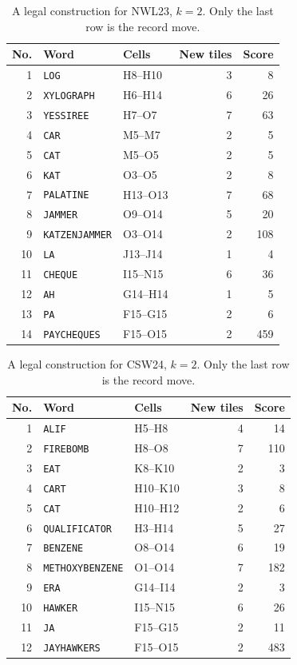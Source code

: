 \clearpage
\begin{table}[!ht]\centering\small
\caption{A legal construction for NWL23, $k=2$. Only the last row is the record move.}
\label{tab:NWL23-2-history}
\begin{tabular}{@{}rllrr@{}}\toprule
No. & Word & Cells & New tiles & Score\\\midrule
1 & \texttt{LOG} & H8--H10 & 3 & 8\\
2 & \texttt{XYLOGRAPH} & H6--H14 & 6 & 26\\
3 & \texttt{YESSIREE} & H7--O7 & 7 & 63\\
4 & \texttt{CAR} & M5--M7 & 2 & 5\\
5 & \texttt{CAT} & M5--O5 & 2 & 5\\
6 & \texttt{KAT} & O3--O5 & 2 & 8\\
7 & \texttt{PALATINE} & H13--O13 & 7 & 68\\
8 & \texttt{JAMMER} & O9--O14 & 5 & 20\\
9 & \texttt{KATZENJAMMER} & O3--O14 & 2 & 108\\
10 & \texttt{LA} & J13--J14 & 1 & 4\\
11 & \texttt{CHEQUE} & I15--N15 & 6 & 36\\
12 & \texttt{AH} & G14--H14 & 1 & 5\\
13 & \texttt{PA} & F15--G15 & 2 & 6\\
\midrule
14 & \texttt{PAYCHEQUES} & F15--O15 & 2 & 459\\
\bottomrule\end{tabular}
\end{table}

\begin{table}[!ht]\centering\small
\caption{A legal construction for CSW24, $k=2$. Only the last row is the record move.}
\label{tab:CSW24-2-history}
\begin{tabular}{@{}rllrr@{}}\toprule
No. & Word & Cells & New tiles & Score\\\midrule
1 & \texttt{ALIF} & H5--H8 & 4 & 14\\
2 & \texttt{FIREBOMB} & H8--O8 & 7 & 110\\
3 & \texttt{EAT} & K8--K10 & 2 & 3\\
4 & \texttt{CART} & H10--K10 & 3 & 8\\
5 & \texttt{CAT} & H10--H12 & 2 & 6\\
6 & \texttt{QUALIFICATOR} & H3--H14 & 5 & 27\\
7 & \texttt{BENZENE} & O8--O14 & 6 & 19\\
8 & \texttt{METHOXYBENZENE} & O1--O14 & 7 & 182\\
9 & \texttt{ERA} & G14--I14 & 2 & 3\\
10 & \texttt{HAWKER} & I15--N15 & 6 & 26\\
11 & \texttt{JA} & F15--G15 & 2 & 11\\
\midrule
12 & \texttt{JAYHAWKERS} & F15--O15 & 2 & 483\\
\bottomrule\end{tabular}
\end{table}
